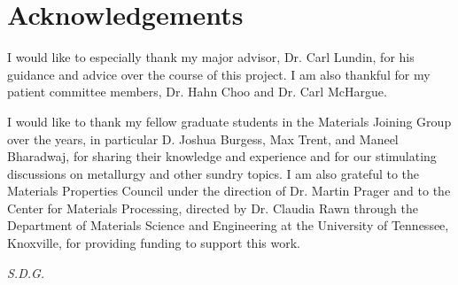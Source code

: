 \chapter*{Acknowledgements}
I would like to especially thank my major advisor, Dr. Carl Lundin, for his guidance and advice over the course of this project. I am also thankful for my patient committee members, Dr. Hahn Choo and Dr. Carl McHargue. 

I would like to thank my fellow graduate students in the Materials Joining Group over the years, in particular D. Joshua Burgess, Max Trent, and Maneel Bharadwaj, for sharing their knowledge and experience and for our stimulating discussions on metallurgy and other sundry topics. I am also grateful to the Materials Properties Council under the direction of Dr. Martin Prager and to the Center for Materials Processing, directed by Dr. Claudia Rawn through the Department of Materials Science and Engineering at the University of Tennessee, Knoxville, for providing funding to support this work.

\vfill
\centerline{\emph{S.D.G.}}